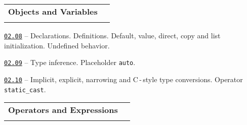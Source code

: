 \documentclass[a4paper,12pt]{article}
\renewenvironment{itemize}
{
    \begin{list}{\labelitemi}
    {
      \setlength{\topsep}{0pt}
      \setlength{\partopsep}{0pt}
      \setlength{\parskip}{0pt}
      \setlength{\itemsep}{0pt}
      \setlength{\parsep}{0pt}
      \setlength{\leftmargin}{14.5pt}
    }
}{\end{list}}
\begin{document}
\bigskip\medskip

\begin{tabular}{!{\vrule width 1pt}L{4.3cm}!{\vrule width 1pt}L{14.7cm}!{\vrule width 0pt}} 


\textbf{Objects and Variables} & \\


\end{tabular}

\medskip\smallskip

\begin{itemize}

    \item \href{https://github.com/i-s-m-mipt/Education/blob/master/projects/examples/source/02.08.cpp}{\texttt{02.08}} -- Declarations. Definitions. Default, value, direct, copy and list initialization. Undefined behavior.

    \smallskip

    \item \href{https://github.com/i-s-m-mipt/Education/blob/master/projects/examples/source/02.09.cpp}{\texttt{02.09}} -- Type inference. Placeholder \lstinline{auto}.

    \smallskip

    \item \href{https://github.com/i-s-m-mipt/Education/blob/master/projects/examples/source/02.10.cpp}{\texttt{02.10}} -- Implicit, explicit, narrowing and C\,-\,style type conversions. Operator \lstinline{static_cast}.

\end{itemize}

\bigskip\medskip

\begin{tabular}{!{\vrule width 1pt}L{5.2cm}!{\vrule width 1pt}L{13.8cm}!{\vrule width 0pt}} 


\textbf{Operators and Expressions} & \\


\end{tabular}

\medskip\smallskip
\end{document}
